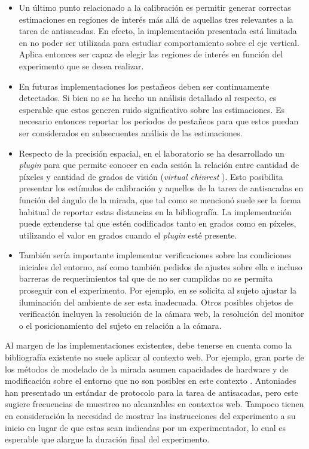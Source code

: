 \begin{itemize}
  \item Un último punto relacionado a la calibración es permitir generar
correctas estimaciones en regiones de interés más allá de aquellas tres
relevantes a la tarea de antisacadas.
  En efecto, la implementación presentada está limitada en no poder ser
utilizada para estudiar comportamiento sobre el eje vertical.
  Aplica entonces ser capaz de elegir las regiones de interés en función del
experimento que se desea realizar.

  \item En futuras implementaciones los pestañeos deben ser continuamente
detectados.
  Si bien no se ha hecho un análisis detallado al respecto, es esperable que
estos generen ruido significativo sobre las estimaciones.
  Es necesario entonces reportar los períodos de pestañeos para que estos
puedan ser considerados en subsecuentes análisis de las estimaciones.

  \item Respecto de la precisión espacial, en el laboratorio se ha desarrollado
un \textit{plugin} para \jspsych que permite conocer en cada sesión la relación
entre cantidad de píxeles y cantidad de grados de visión (\textit{virtual
chinrest} \cite{li_2020_virtual_chinrest}).
  Esto posibilita presentar los estímulos de calibración y aquellos de la tarea
de antisacadas en función del ángulo de la mirada, que tal como se mencionó
suele ser la forma habitual de reportar estas distancias en la bibliografía.
  La implementación puede extenderse tal que estén codificados tanto en grados
como en píxeles, utilizando el valor en grados cuando el \textit{plugin} esté
presente.

  \item También sería importante implementar verificaciones sobre las
condiciones iniciales del entorno, así como también pedidos de ajustes sobre
ella e incluso barreras de requerimientos tal que de no ser cumplidas no se
permita proseguir con el experimento.
  Por ejemplo, en \turkergaze se solicita al sujeto ajustar la iluminación del
ambiente de ser esta inadecuada.
  Otros posibles objetos de verificación incluyen la resolución de la cámara
web, la resolución del monitor o el posicionamiento del sujeto en relación a la
cámara.
\end{itemize}


Al margen de las implementaciones existentes, debe tenerse en cuenta como la
bibliografía existente no suele aplicar al contexto web.
Por ejemplo, gran parte de los métodos de modelado de la mirada asumen
capacidades de hardware y de modificación sobre el entorno que no son posibles
en este contexto \cite{hansen_2009_eye_of_the_beholder}.
Antoniades \etal \cite{antoniades_2013_standarized_protocol} han presentado un
estándar de protocolo para la tarea de antisacadas, pero este sugiere
frecuencias de muestreo no alcanzables en contextos web.
Tampoco tienen en consideración la necesidad de mostrar las instrucciones del
experimento a su inicio en lugar de que estas sean indicadas por un
experimentador, lo cual es esperable que alargue la duración final del
experimento. 

